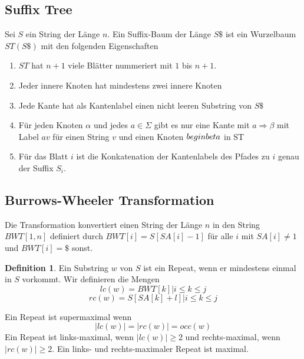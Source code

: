 \documentclass[a4paper, 12pt]{article}
\theoremstyle{plain}
\theoremstyle{definition}
\newtheorem{definition}[theorem]{Definition} %
\theoremstyle{lemma}
\theoremstyle{remark}
\theoremstyle{corollary}
\theoremstyle{example}
\begin{document}
	\subsection{Suffix Tree}
	Sei $S$ ein String der Länge $n$. Ein Suffix-Baum der Länge $S\$$ ist ein Wurzelbaum $ST(S\$)$ mit den folgenden Eigenschaften \begin{enumerate}
		\item $ST$ hat $n+1$ viele Blätter nummeriert mit $1$ bis $n+1$.
		\item Jeder innere Knoten hat mindestens zwei innere Knoten
		\item Jede Kante hat als Kantenlabel einen nicht leeren Substring von $S\$$
		\item Für jeden Knoten $\alpha$ und jedes $a \in \Sigma$ gibt es nur eine Kante mit $a\Rightarrow \beta$ mit Label $av$ für einen String $v$ und einen Knoten $\\begin
		beta$ in ST
		\item Für das Blatt $i$ ist die Konkatenation der Kantenlabels des Pfades zu $i$ genau der Suffix $S_i$.
	\end{enumerate}
	\subsection{Burrows-Wheeler Transformation}
	Die Transformation konvertiert einen String der Länge $n$ in den String $BWT[1,n]$ definiert durch $BWT[i] = S[SA[i]-1]$ für alle $i$ mit $SA[i]\neq 1$ und $BWT[i] = \$$ sonst.
	\begin{definition}
		Ein Substring $w$ von $S$ ist ein Repeat, wenn er mindestens einmal in $S$ vorkommt. Wir definieren die Mengen
		\[lc(w) = {BWT[k] | i \leq k \leq j}\]
		\[rc(w) = {S[SA[k] + l] | i \leq k \leq j}\]
	\end{definition} 
	Ein Repeat ist supermaximal wenn \[\left|lc(w)\right| = \left|rc(w)\right| = occ(w)\]
	Ein Repeat ist links-maximal, wenn $\left|lc(w)\right| \geq 2$ und rechts-maximal, wenn $\left|rc(w)\right| \geq 2$. Ein links- und rechts-maximaler Repeat ist maximal.
\end{document}
